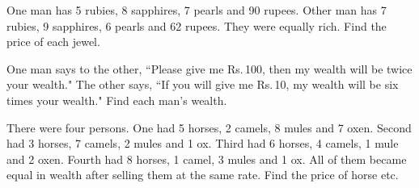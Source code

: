 \documentclass[]{article}
\begin{document}
\begin{quote}  {
}  \end{quote}

{One man has 5 rubies, 8 sapphires, 7 pearls and 90 rupees. Other man has
7 rubies, 9 sapphires, 6 pearls and 62 rupees. They were equally rich.
Find the price of each jewel.}

\begin{quote}  {
}  \end{quote}

{One man says to the other, ``Please give me Rs.\,100, then my wealth
will be twice your wealth." The other says, ``If you will give me Rs.\,10,
my wealth will be six times your wealth." Find each man's wealth.}

\begin{quote}  {
}  \end{quote}

{There were four persons. One had 5 horses, 2 camels, 8 mules and 7
oxen. Second had 3 horses, 7 camels, 2 mules and 1 ox. Third had 6
horses, 4 camels, 1 mule and 2 oxen. Fourth had 8 horses, 1 camel, 3
mules and 1 ox. All of them became equal in wealth after selling them at
the same rate. Find the price of horse etc.}

\begin{quote}  {
}  \end{quote}
\end{document}
